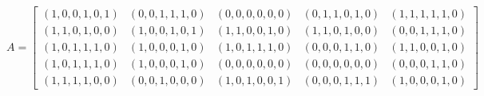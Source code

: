 \documentclass[12pt,letterpaper]{article}
\begin{document}
        \begin{equation*}
            A = 
            \begin{bmatrix}
                (1,0,0,1,0,1)       &(0,0,1,1,1,0)          &(0,0,0,0,0,0)      &(0,1,1,0,1,0)      &(1,1,1,1,1,0)\\
                (1,1,0,1,0,0)       &(1,0,0,1,0,1)          &(1,1,0,0,1,0)      &(1,1,0,1,0,0)      &(0,0,1,1,1,0)\\
                (1,0,1,1,1,0)       &(1,0,0,0,1,0)          &(1,0,1,1,1,0)      &(0,0,0,1,1,0)      &(1,1,0,0,1,0)\\
                (1,0,1,1,1,0)       &(1,0,0,0,1,0)          &(0,0,0,0,0,0)      &(0,0,0,0,0,0)      &(0,0,0,1,1,0)\\
                (1,1,1,1,0,0)       &(0,0,1,0,0,0)          &(1,0,1,0,0,1)      &(0,0,0,1,1,1)      &(1,0,0,0,1,0)
            \end{bmatrix}
        \end{equation*}
\end{document}
